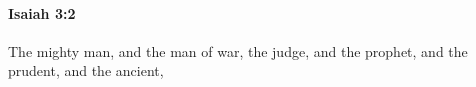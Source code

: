 
		\paragraph{Isaiah 3:2} %
			\label{ISAIAH-3-2}

			The mighty man, and the man of war, the judge, and the prophet, and the prudent, and the ancient,


